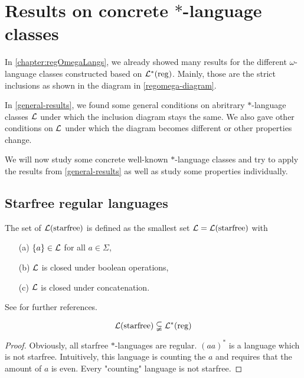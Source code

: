 \section{Results on concrete $*$-language classes}
\label{concrete-results}

In \cref{chapter:regOmegaLangs}, we already showed many results for the different $\omega$-language classes constructed based on $\mathcal{L}^*(\textup{\textrm{reg}})$. Mainly, those are the strict inclusions as shown in the diagram in \cref{regomega-diagram}.

In \cref{general-results}, we found some general conditions on abritrary $*$-language classes $\mathcal{L}$ under which the inclusion diagram stays the same. We also gave other conditions on $\mathcal{L}$ under which the diagram becomes different or other properties change.

We will now study some concrete well-known $*$-language classes and try to apply the results from \cref{general-results} as well as study some properties individually.


\subsection{Starfree regular languages}
The set of  $\mathcal{L}(\textup{\textrm{starfree}})$ is defined as the smallest set $\mathcal{L} = \mathcal{L}(\textup{\textrm{starfree}})$ with
\begin{itemize}
\item[(a)] $\Set{a} \in \Lang$ for all $a \in \Sigma$,
\item[(b)] $\mathcal{L}$ is closed under boolean operations,
\item[(c)] $\mathcal{L}$ is closed under concatenation.
\end{itemize}
See \cite[Section 2.2]{ConcHierR104} for further references.

\begin{lemma}
\[ \mathcal{L}(\textup{\textrm{starfree}}) \subsetneqq \mathcal{L}^*(\textup{\textrm{reg}}) \]
\begin{proof}
Obviously, all starfree $*$-languages are regular. $(aa)^*$ is a language which is not starfree. Intuitively, this language is counting the $a$ and requires that the amount of $a$ is even. Every "counting" language is not starfree.
\end{proof}
\end{lemma}

